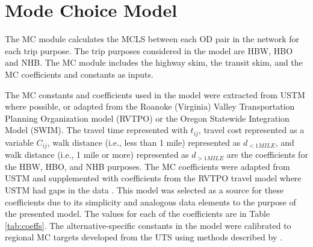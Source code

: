 \section{Mode Choice Model}

The MC module calculates the MCLS between each OD pair in the
network for each trip purpose. The trip purposes considered in the model are HBW, HBO and NHB. The MC module includes the highway skim,
the transit skim, and the MC coefficients and constants as inputs.

The MC constants and coefficients used in the model were extracted
from USTM where possible, or adapted from the Roanoke (Virginia)
Valley Transportation Planning Organization model (RVTPO) or the Oregon Statewide Integration Model (SWIM). The travel time represented with $t_{ij}$, travel cost
represented as a variable $C_{ij}$, walk distance (i.e., less than 1 mile) represented
as $d_{<1MILE}$, and walk distance (i.e., 1 mile or more) represented as $d_{>1MILE}$
are the coefficients for the
HBW, HBO, and NHB purposes. The MC coefficients were adapted
from USTM and supplemented with coefficients from the RVTPO travel model where USTM had gaps in the data \citep{rvtpoversion, swimversion}. This model was
selected as a source for these coefficients due to its simplicity and analogous data elements to the purpose of the presented model. The
values for each of the coefficients are in Table \ref{tab:coeffs}. The alternative-specific constants in the model were calibrated to regional MC
targets developed from the UTS using
methods described by \citet{koppelman2006}.

